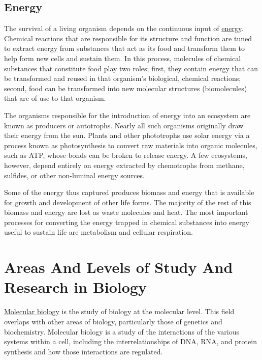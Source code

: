 \hypertarget{energy}{%
\subsection{Energy}\label{energy}}

The survival of a living organism depends on the continuous input of \href{https://en.wikipedia.org/wiki/Energy}{energy}. Chemical reactions that are responsible for its structure and function are tuned to extract energy from substances that act as its food and transform them to help form new cells and sustain them. In this process, molecules of chemical substances that constitute food play two roles; first, they contain energy that can be transformed and reused in that organism's biological, chemical reactions; second, food can be transformed into new molecular structures (biomolecules) that are of use to that organism.

The organisms responsible for the introduction of energy into an ecosystem are known as producers or autotrophs. Nearly all such organisms originally draw their energy from the sun. Plants and other phototrophs use solar energy via a process known as photosynthesis to convert raw materials into organic molecules, such as ATP, whose bonds can be broken to release energy. A few ecosystems, however, depend entirely on energy extracted by chemotrophs from methane, sulfides, or other non-luminal energy sources.

Some of the energy thus captured produces biomass and energy that is available for growth and development of other life forms. The majority of the rest of this biomass and energy are lost as waste molecules and heat. The most important processes for converting the energy trapped in chemical substances into energy useful to sustain life are metabolism and cellular respiration.

\hypertarget{areas-and-levels-of-study-and-research-in-biology}{%
\section{Areas And Levels of Study And Research in Biology}\label{areas-and-levels-of-study-and-research-in-biology}}

\href{https://en.wikipedia.org/wiki/Molecular_biology}{Molecular biology} is the study of biology at the molecular level. This field overlaps with other areas of biology, particularly those of genetics and biochemistry. Molecular biology is a study of the interactions of the various systems within a cell, including the interrelationships of DNA, RNA, and protein synthesis and how those interactions are regulated.


